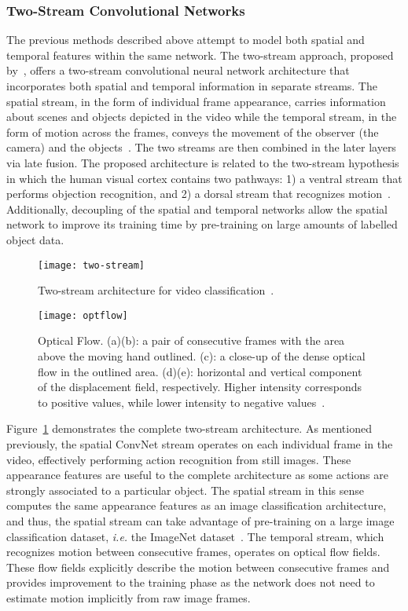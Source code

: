 \subsubsection{Two-Stream Convolutional Networks}
The previous methods described above attempt to model both spatial and temporal features within the same network. The two-stream approach, proposed by~\cite{TwoStream:2014}, offers a two-stream convolutional neural network architecture that incorporates both spatial and temporal information in separate streams. The spatial stream, in the form of individual frame appearance, carries information about scenes and objects depicted in the video while the temporal stream, in the form of motion across the frames, conveys the movement of the observer (the camera) and the objects~\cite{TwoStream:2014}. The two streams are then combined in the later layers via late fusion. The proposed architecture is related to the two-stream hypothesis in which the human visual cortex contains two pathways: 1) a ventral stream that performs objection recognition, and 2) a dorsal stream that recognizes motion~\cite{SeparateVisPaths:1992}. Additionally, decoupling of the spatial and temporal networks allow the spatial network to improve its training time by pre-training on large amounts of labelled object data.

\begin{figure}
  \centering
    \texttt{[image: two-stream]}
    \caption{Two-stream architecture for video classification~\cite{TwoStream:2014}.}
    \label{fig:two-stream}
\end{figure}

\begin{figure}
  \centering
    \texttt{[image: optflow]}
    \caption{Optical Flow. (a)(b): a pair of consecutive frames with the area above the moving hand outlined. (c): a close-up of the dense optical flow in the outlined area. (d)(e): horizontal and vertical component of the displacement field, respectively. Higher intensity corresponds to positive values, while lower intensity to negative values~\cite{TwoStream:2014}.}
    \label{fig:optflow}
\end{figure}

Figure~\ref{fig:two-stream} demonstrates the complete two-stream architecture. As mentioned previously, the spatial ConvNet stream operates on each individual frame in the video, effectively performing action recognition from still images. These appearance features are useful to the complete architecture as some actions are strongly associated to a particular object. The spatial stream in this sense computes the same appearance features as an image classification architecture, and thus, the spatial stream can take advantage of pre-training on a large image classification dataset, \emph{i.e.} the ImageNet dataset~\cite{Krizhevsky:2012}. The temporal stream, which recognizes motion between consecutive frames, operates on optical flow fields. These flow fields explicitly describe the motion between consecutive frames and provides improvement to the training phase as the network does not need to estimate motion implicitly from raw image frames.

